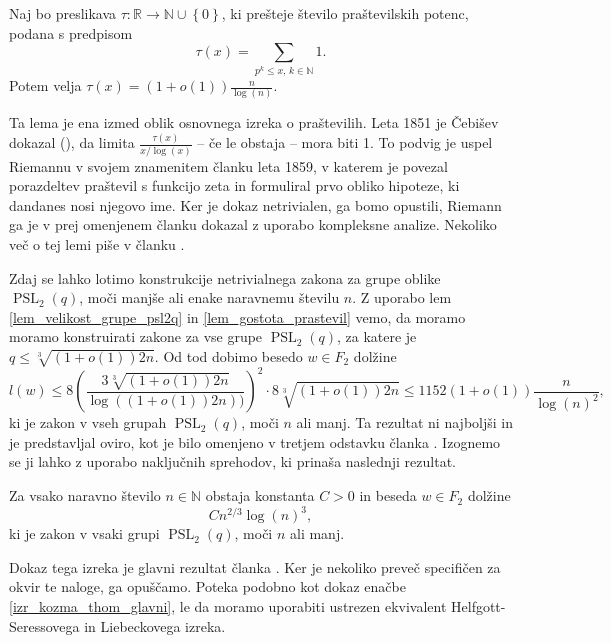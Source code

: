    \begin{lema}
    \label{lem_gostota_prastevil}
    Naj bo preslikava $\tau : \mathbb{R} \to \mathbb{N} \cup \left\{ 0\right\}$, ki prešteje število praštevilskih potenc, podana s predpisom \begin{equation*}
    \tau(x) = \sum_{p^{k} \le x, \, k \in \mathbb{N}} 1.
    \end{equation*}  
     Potem velja $\tau(x) = (1 + o(1)) \frac{n}{\log(n)}$.     
    \end{lema}
    Ta lema je ena izmed oblik osnovnega izreka o praštevilih. Leta     1851 je Čebišev dokazal (\cite[str.~4--5]{Granville_1993}), da limita $\frac{\tau(x)}{x / \log(x)}$ -- če le obstaja -- mora biti 1. To podvig je uspel Riemannu v svojem znamenitem članku \cite{Riemann_1859} leta 1859, v katerem je povezal porazdeltev praštevil s funkcijo zeta in formuliral prvo obliko hipoteze, ki dandanes nosi njegovo ime.
    Ker je dokaz netrivialen, ga bomo opustili, Riemann ga je v prej omenjenem članku dokazal z uporabo kompleksne analize. 
    Nekoliko več o tej lemi piše v članku \cite{Kozma_Thom_2016}.            
   
    Zdaj se lahko lotimo konstrukcije netrivialnega zakona za grupe oblike $\operatorname{PSL}_2(q)$, moči manjše ali enake naravnemu številu $n$. Z uporabo lem \ref{lem_velikost_grupe_psl2q} in \ref{lem_gostota_prastevil}
    vemo, da moramo moramo konstruirati zakone za vse grupe $\operatorname{PSL}_2(q)$, za katere je $q \le \sqrt[3]{(1 + o(1)) 2n}$. Od tod dobimo besedo $w \in F_2$ dolžine \begin{equation*}
    l(w) \le 8 \left( \frac{3 \sqrt[3]{(1 + o(1)) 2n}}{\log((1 + o(1)) 2n))}  \right)^2 \cdot 8 \sqrt[3]{(1 + o(1)) 2n} \le 1152 (1 + o(1)) \frac{n}{\log(n)^2},
    \end{equation*}  
    ki je zakon v vseh grupah $\operatorname{PSL}_2(q)$, moči $n$ ali manj. Ta rezultat ni najboljši in je predstavljal oviro, kot je bilo omenjeno v tretjem odstavku članka \cite[str.~6]{Bradford_Thom_2017}.
    Izognemo se ji lahko z uporabo naključnih sprehodov, ki prinaša naslednji rezultat.

    \begin{izrek}
    \label{izr_bradford_thom}
    Za vsako naravno število $n \in \mathbb{N}$ obstaja konstanta $C > 0$ in beseda $w \in F_2$ dolžine \begin{equation*}
        C n^{2 / 3} {\log(n)}^3,
        \end{equation*}  
        ki je zakon v vsaki grupi $\operatorname{PSL}_2(q)$, moči $n$ ali manj.
    \end{izrek}
    Dokaz tega izreka je glavni rezultat članka \cite{Bradford_Thom_2017}. Ker je nekoliko preveč specifičen za okvir te naloge, ga opuščamo.
    Poteka podobno kot dokaz enačbe \ref{izr_kozma_thom_glavni}, le da moramo uporabiti ustrezen ekvivalent Helfgott-Seressovega in Liebeckovega izreka. 


